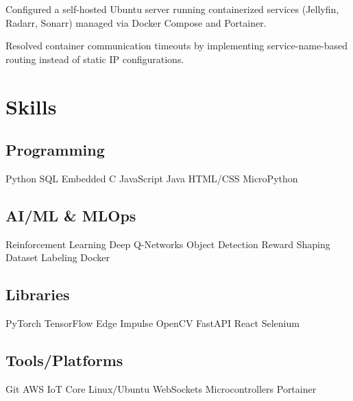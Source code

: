 \documentclass[]{plushcv}
\begin{document}
\begin{minipage}[t]{0.68\textwidth}
\begin{tightemize}
\item Configured a self-hosted Ubuntu server running containerized services (Jellyfin, Radarr, Sonarr) managed via Docker Compose and Portainer.
\item Resolved container communication timeouts by implementing service-name-based routing instead of static IP configurations.
\end{tightemize}
\sectionsep


\end{minipage} 
\hfill
\begin{minipage}[t]{0.28\textwidth} 


\section{Skills}

\subsection{Programming}
\sectionsep
Python \textbullet{} SQL \textbullet{} Embedded C \textbullet{} JavaScript \textbullet{} Java \textbullet{} HTML/CSS \textbullet{} MicroPython

\sectionsep

\subsection{AI/ML \& MLOps}
\sectionsep
Reinforcement Learning \textbullet{} Deep Q-Networks \textbullet{} Object Detection \textbullet{} Reward Shaping \textbullet{} Dataset Labeling \textbullet{} Docker 

\sectionsep

\subsection{Libraries}
\sectionsep
PyTorch \textbullet{} TensorFlow \textbullet{} Edge Impulse \textbullet{} OpenCV \textbullet{} FastAPI \textbullet{} React \textbullet{} Selenium

\sectionsep

\subsection{Tools/Platforms}
\sectionsep
Git \textbullet{} AWS IoT Core \textbullet{} Linux/Ubuntu \textbullet{} WebSockets \textbullet{} Microcontrollers \textbullet{} Portainer


\end{minipage}
\end{document}
